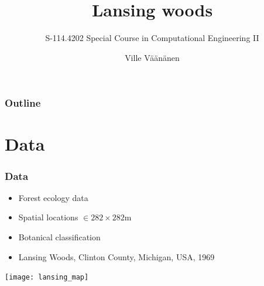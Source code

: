 \documentclass[t]{beamer}
\title[Lansing woods]{%
	Lansing woods
}
\subtitle[S-114.4202]{%
	S-114.4202 Special Course in Computational Engineering II
}
\author[Väänänen]{%
	Ville Väänänen
}
\institute[Aalto University School of Science]{%
	Aalto University School of Science
}
\begin{document}

\maketitle

\begin{frame}
	\frametitle{Outline}
	\tableofcontents
\end{frame}
\section{Data}

\begin{frame}
	\frametitle{Data}
	\vskip -30pt
	\begin{itemize}
  		\item Forest ecology data
  		\item Spatial locations $\in 282\times 282$m
  		\item Botanical classification
  		\item Lansing Woods, Clinton County, Michigan, USA, 1969 
	\end{itemize}
	\begin{centering}
		\texttt{[image: lansing\_map]}
	\end{centering}
\end{frame}
	
	
\end{document}
